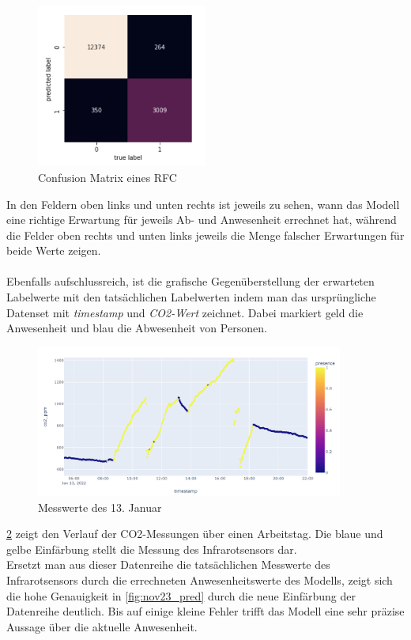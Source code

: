 \begin{figure}[h]
    \centering
    \includegraphics[width=0.5\textwidth]{pic/confusion_matrix.png}
    \caption{Confusion Matrix eines RFC}
    \label{fig:ConMatrix}
\end{figure}

In den Feldern oben links und unten rechts ist jeweils zu sehen, wann das Modell eine richtige Erwartung 
für jeweils Ab- und Anwesenheit errechnet hat, während die Felder oben rechts und unten links jeweils die 
Menge falscher Erwartungen für beide Werte zeigen.\\\\

\newpage
Ebenfalls aufschlussreich, ist die grafische Gegenüberstellung der erwarteten Labelwerte mit den tatsächlichen Labelwerten
indem man das ursprüngliche Datenset mit \textit{timestamp} und \textit{CO2-Wert} zeichnet. Dabei markiert geld die Anwesenheit
und blau die Abwesenheit von Personen.

\begin{figure}[h]
    \centering
    \includegraphics[width=0.9\textwidth]{pic/nov23_actual.png}
    \caption{Messwerte des 13. Januar}
    \label{fig:nov23}
\end{figure}

\ref{fig:nov23} zeigt den Verlauf der CO2-Messungen über einen Arbeitstag. Die blaue und gelbe Einfärbung stellt
die Messung des Infrarotsensors dar.\\ 
Ersetzt man aus dieser Datenreihe die tatsächlichen Messwerte des Infrarotsensors durch die errechneten 
Anwesenheitswerte des Modells, zeigt sich die hohe Genauigkeit in \ref{fig:nov23_pred} durch die neue Einfärbung 
der Datenreihe deutlich. 
Bis auf einige kleine Fehler trifft das Modell eine sehr präzise Aussage über die aktuelle Anwesenheit.


